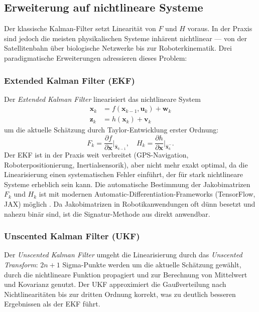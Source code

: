 ﻿\documentclass[a4paper,12pt]{article}
\theoremstyle{definition}
\begin{document}
\subsection{Erweiterung auf nichtlineare Systeme}

Der klassische Kalman-Filter setzt Linearität von $F$ und $H$ voraus. In der Praxis
sind jedoch die meisten physikalischen Systeme inhärent nichtlinear --- von der
Satellitenbahn über biologische Netzwerke bis zur Roboterkinematik. Drei paradigmatische
Erweiterungen adressieren dieses Problem:

\subsubsection{Extended Kalman Filter (EKF)}

Der \emph{Extended Kalman Filter} \cite{jazwinski1970} linearisiert das nichtlineare System
\begin{align}
    \mathbf{x}_k &= f(\mathbf{x}_{k-1}, \mathbf{u}_k) + \mathbf{w}_k \\
    \mathbf{z}_k &= h(\mathbf{x}_k) + \mathbf{v}_k
\end{align}
um die aktuelle Schätzung durch Taylor-Entwicklung erster Ordnung:
\[
    F_k = \frac{\partial f}{\partial \mathbf{x}}\bigg|_{\hat{\mathbf{x}}_{k-1}},
    \quad
    H_k = \frac{\partial h}{\partial \mathbf{x}}\bigg|_{\hat{\mathbf{x}}_k^-}.
\]
Der EKF ist in der Praxis weit verbreitet (GPS-Navigation, Roboterpositionierung,
Inertialsensorik), aber nicht mehr exakt optimal, da die Linearisierung einen
systematischen Fehler einführt, der für stark nichtlineare Systeme erheblich sein kann.
Die automatische Bestimmung der Jakobimatrizen $F_k$ und $H_k$ ist mit modernen
Automatic-Differentiation-Frameworks (TensorFlow, JAX) möglich \cite{baydin2018}.
Da Jakobimatrizen in Robotikanwendungen oft dünn besetzt und nahezu binär sind,
ist die Signatur-Methode aus \cite{epp2026boolmm} direkt anwendbar.

\subsubsection{Unscented Kalman Filter (UKF)}

Der \emph{Unscented Kalman Filter} \cite{julier2004} umgeht die Linearisierung durch
das \emph{Unscented Transform}: $2n+1$ Sigma-Punkte werden um die aktuelle Schätzung
gewählt, durch die nichtlineare Funktion propagiert und zur Berechnung von Mittelwert
und Kovarianz genutzt. Der UKF approximiert die Gaußverteilung nach Nichtlinearitäten
bis zur dritten Ordnung korrekt, was zu deutlich besseren Ergebnissen als der EKF führt.
\end{document}
